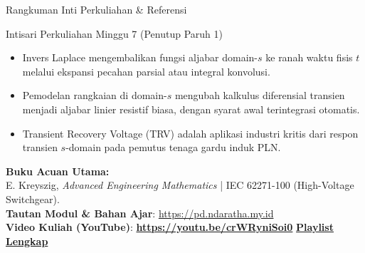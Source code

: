 \documentclass[aspectratio=169,10pt]{beamer}
\begin{document}
\begin{frame}{Rangkuman Inti Perkuliahan \& Referensi}
  \begin{exampleblock}{Intisari Perkuliahan Minggu 7 (Penutup Paruh 1)}
    \begin{itemize}
      \item Invers Laplace mengembalikan fungsi aljabar domain-$s$ ke ranah waktu fisis $t$ melalui ekspansi pecahan parsial atau integral konvolusi.
      \item Pemodelan rangkaian di domain-$s$ mengubah kalkulus diferensial transien menjadi aljabar linier resistif biasa, dengan syarat awal terintegrasi otomatis.
      \item Transient Recovery Voltage (TRV) adalah aplikasi industri kritis dari respon transien $s$-domain pada pemutus tenaga gardu induk PLN.
    \end{itemize}
  \end{exampleblock}
  \vspace{0.2cm}
  \begin{center}
    \small \textbf{Buku Acuan Utama:} \\
    E. Kreyszig, \textit{Advanced Engineering Mathematics} | IEC 62271-100 (High-Voltage Switchgear). \\
    \vspace{0.3cm}
    \textbf{Tautan Modul \& Bahan Ajar}: \url{https://pd.ndaratha.my.id} \\[0.12cm]\textbf{Video Kuliah (YouTube)}: {\color{red!85!black}\textbf{\url{https://youtu.be/crWRyniSoi0}}} \quad \textbar \quad \href{https://www.youtube.com/playlist?list=PLS5oOZWXZeTw}{\color{unibblue}\textbf{Playlist Lengkap}}
  \end{center}
\end{frame}
\end{document}
